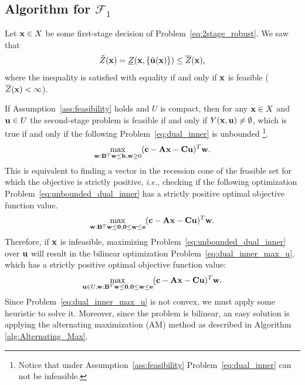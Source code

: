 \documentclass[12pt,x11names]{article}
\theoremstyle{definition}
\newcommand{\ie}{{\em i.e.}, }
\newcommand{\bzero}{{\bf 0}}
\newcommand{\bone}{{\bf e}}
\newcommand{\bb}{{\bf b}}
\newcommand{\bc}{{\bf c}}
\newcommand{\bu}{{\bf u}}
\newcommand{\bw}{{\bf w}}
\newcommand{\bx}{{\bf x}}
\newcommand{\bba}{{\bf A}}
\newcommand{\bbb}{{\bf B}}
\newcommand{\bbc}{{\bf C}}
\begin{document}
\subsection{Algorithm for $\mathcal{F}_1$}\label{sec:F1}
Let $\bx\in X$ be some first-stage decision of Problem~\eqref{eq:2stage_robust}. We saw that
$$\tilde{Z}(\bx)=\underline{Z}(\bx,\{\tilde{\bu}(\bx)\})\leq \overline{Z}(\bx),$$ 
where the inequality is satisfied with equality if and only if $\bx$ is feasible ($\overline{Z}(\bx)<\infty$).

If Assumption~\ref{ass:feasibility} holds and $U$ is compact, then for any $\bx\in X$ and $\bu\in U$ the second-stage problem is feasible if and only if $Y(\bx,\bu)\neq \emptyset$, which is true if and only if the following Problem~\eqref{eq:dual_inner} is unbounded \footnote{Notice that under Assumption~\ref{ass:feasibility} Problem~\eqref{eq:dual_inner} can not be infeasible.}. 
\begin{equation}\label{eq:dual_inner}
\max_{\bw:\bbb^T\bw\leq \bb, \bw\geq 0} (\bc-\bba\bx-\bbc \bu)^T\bw.
\end{equation}
This is equivalent to finding a vector in the recession cone of the feasible set for which the objective is strictly positive, \ie checking if the following optimization Problem~\eqref{eq:unbounded_dual_inner} has a strictly positive optimal objective function value.
\begin{equation}\label{eq:unbounded_dual_inner}
\max_{\bw:\bbb^T\bw\leq \bzero, \bzero\leq\bw\leq \bone} (\bc-\bba\bx-\bbc \bu)^T\bw.
\end{equation}
Therefore, if $\bx$ is infeasible, maximizing Problem~\eqref{eq:unbounded_dual_inner} over $\bu$ will result in the bilinear optimization Problem~\eqref{eq:dual_inner_max_u}, which has a strictly positive optimal objective function value:
\begin{equation}\label{eq:dual_inner_max_u}
\max_{\bu\in U,\bw:\bbb^T\bw\leq \bzero, \bzero\leq\bw\leq \bone} (\bc-\bba\bx-\bbc \bu)^T\bw.
\end{equation}
Since Problem~\eqref{eq:dual_inner_max_u} is not convex, we must apply some heuristic to solve it. Moreover, since the problem is bilinear, an easy solution is applying the alternating maximization (AM) method as described in Algorithm \ref{alg:Alternating_Max}. 
\end{document}
